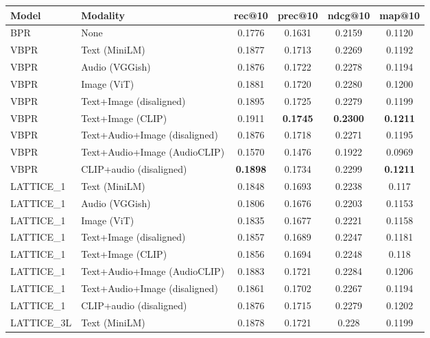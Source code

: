 \begin{table}[H]
    \centering
    \begin{adjustbox}{max width=\textwidth}
    \begin{tabular}{|l|l|c|c|c|c|}
    \hline
    	\textbf{Model} & \textbf{Modality} & \textbf{rec@10} & \textbf{prec@10} & \textbf{ndcg@10} & \textbf{map@10} \\
    \hline
    BPR & None & 0.1776 & 0.1631 & 0.2159 & 0.1120 \\
    \hline
    VBPR & Text (MiniLM) & 0.1877 & 0.1713 & 0.2269 & 0.1192 \\
    \hline
    VBPR & Audio (VGGish) & 0.1876 & 0.1722 & 0.2278 & 0.1194 \\
    \hline
    VBPR & Image (ViT) & 0.1881 & 0.1720 & 0.2280 & 0.1200 \\
    \hline
    VBPR & Text+Image (disaligned) & 0.1895 & 0.1725 & 0.2279 & 0.1199 \\
    \hline
    VBPR & Text+Image (CLIP) & 0.1911 & \textbf{0.1745} & \textbf{0.2300} & \textbf{0.1211} \\
    \hline
    VBPR & Text+Audio+Image (disaligned) & 0.1876 & 0.1718 & 0.2271 & 0.1195 \\
    \hline
    VBPR & Text+Audio+Image (AudioCLIP) & 0.1570 & 0.1476 & 0.1922 & 0.0969 \\
    \hline
    VBPR & CLIP+audio (disaligned) & \textbf{0.1898} & 0.1734 & 0.2299 & \textbf{0.1211} \\
    \hline
    LATTICE\_1 & Text (MiniLM) & 0.1848 & 0.1693 & 0.2238 & 0.117 \\
    \hline
    LATTICE\_1 & Audio (VGGish) & 0.1806 & 0.1676 & 0.2203 & 0.1153 \\
    \hline
    LATTICE\_1 & Image (ViT) & 0.1835 & 0.1677 & 0.2221 & 0.1158 \\
    \hline
    LATTICE\_1 & Text+Image (disaligned) & 0.1857 & 0.1689 & 0.2247 & 0.1181 \\
    \hline
    LATTICE\_1 & Text+Image (CLIP) & 0.1856 & 0.1694 & 0.2248 & 0.118 \\
    \hline
    LATTICE\_1 & Text+Audio+Image (AudioCLIP) & 0.1883 & 0.1721 & 0.2284 & 0.1206 \\
    \hline
    LATTICE\_1 & Text+Audio+Image (disaligned) & 0.1861 & 0.1702 & 0.2267 & 0.1194 \\
    \hline
    LATTICE\_1 & CLIP+audio (disaligned) & 0.1876 & 0.1715 & 0.2279 & 0.1202 \\
    \hline
    LATTICE\_3L & Text (MiniLM) & 0.1878 & 0.1721 & 0.228 & 0.1199 \\

\end{tabular}
\end{adjustbox}
\end{table}
